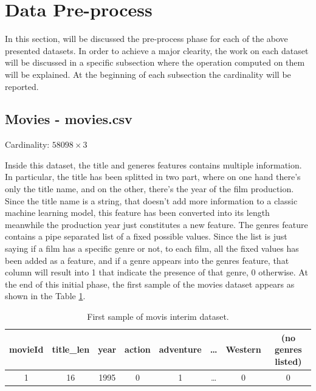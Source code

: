 \documentclass[../main]{subfiles}
\begin{document}
\section{Data Pre-process}
In this section, will be discussed the pre-process phase for each of the above presented datasets.
In order to achieve a major clearity, the work on each dataset will be discussed in a specific subsection where the operation computed on them will be explained.
At the beginning of each subsection the cardinality will be reported.
\newpage

\subsection*{Movies - movies.csv}
Cardinality: $58098 \times 3$

Inside this dataset, the title and generes features contains multiple information.
In particular, the title has been splitted in two part, where on one hand there's only the title name, and on the other, there's the year of the film production.
Since the title name is a string, that doesn't add more information to a classic machine learning model, this feature has been converted into its length meanwhile the production year just constitutes a new feature.
The genres feature contains a pipe separated list of a fixed possible values.
Since the list is just saying if a film has a specific genre or not, to each film, all the fixed values has been added as a feature, and if a genre appears into the genres feature, that column will result into 1 that indicate the presence of that genre, 0 otherwise.
At the end of this initial phase, the first sample of the movies dataset appears as shown in the Table \ref{table:movies-first-sample}.
\begin{table}[h]
    \center
    \begin{tabular}{|c|c|c|c|c|c|c|c|}
    \hline
    \textbf{movieId} & \textbf{title\_len} & \textbf{year} & \textbf{action} & \textbf{adventure} & \textbf{\dots}  & \textbf{Western} & \textbf{(no genres listed)} \\
    \hline
    1                & 16                  & 1995          & 0               & 1                  & \dots           & 0                & 0                           \\
    \hline
    \end{tabular}
    \caption{First sample of movis interim dataset.}
    \label{table:movies-first-sample}
\end{table}
\end{document}
